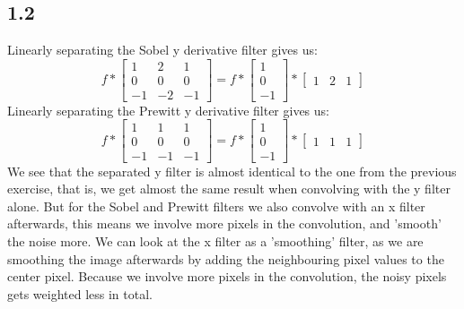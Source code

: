 \subsection*{1.2}
Linearly separating the Sobel y derivative filter gives us:\\
\begin{equation*}
	f*\begin{bmatrix}
		1&2&1\\
		0&0&0\\
		-1&-2&-1
	\end{bmatrix}
 = f*\begin{bmatrix}
 	1\\
 	0\\
 	-1
 \end{bmatrix}
* \begin{bmatrix}
	1&2&1
\end{bmatrix}
\end{equation*}
Linearly separating the Prewitt y derivative filter gives us:\\
\begin{equation*}
	f*\begin{bmatrix}
		1&1&1\\
		0&0&0\\
		-1&-1&-1
	\end{bmatrix}
	= f*\begin{bmatrix}
		1\\
		0\\
		-1
	\end{bmatrix}
	* \begin{bmatrix}
		1&1&1
	\end{bmatrix}
\end{equation*}
We see that the separated y filter is almost identical to the one from the previous exercise, that is, we get almost the same result when convolving with the y filter alone. But for the Sobel and Prewitt filters we also convolve with an x filter afterwards, this means we involve more pixels in the convolution, and 'smooth' the noise more. We can look at the x filter as a 'smoothing' filter, as we are smoothing the image afterwards by adding the neighbouring pixel values to the center pixel. Because we involve more pixels in the convolution, the noisy pixels gets weighted less in total.

